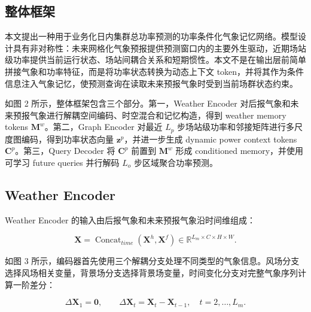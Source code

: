 

\subsection{整体框架}

本文提出一种用于业务化日内集群总功率预测的功率条件化气象记忆网络。模型设计具有非对称性：未来网格化气象预报提供预测窗口内的主要外生驱动，近期场站级功率提供当前运行状态、场站间耦合关系和短期惯性。本文不是在输出层前简单拼接气象和功率特征，而是将功率状态转换为动态上下文 token，并将其作为条件信息注入气象记忆，使预测查询在读取未来预报气象时受到当前场群状态约束。

如图 2 所示，整体框架包含三个部分。第一，Weather Encoder 对后报气象和未来预报气象进行解耦空间编码、时空混合和记忆构造，得到 weather memory tokens \(\mathbf{M}^{w}\)。第二，Graph Encoder 对最近 \(L_p\) 步场站级功率和邻接矩阵进行多尺度图编码，得到功率状态向量 \(\mathbf{z}^{p}\)，并进一步生成 dynamic power context tokens \(\mathbf{C}^{p}\)。第三，Query Decoder 将 \(\mathbf{C}^{p}\) 前置到 \(\mathbf{M}^{w}\) 形成 conditioned memory，并使用可学习 future queries 并行解码 \(L_o\) 步区域聚合功率预测。


\subsection{Weather Encoder}

Weather Encoder 的输入由后报气象和未来预报气象沿时间维组成：

\begin{equation}
\mathbf{X}=\operatorname{Concat}_{time}(\mathbf{X}^{h},\mathbf{X}^{f})\in\mathbb{R}^{L_m\times C\times H\times W}.
\end{equation}

如图 3 所示，编码器首先使用三个解耦分支处理不同类型的气象信息。风场分支选择风场相关变量，背景场分支选择背景场变量，时间变化分支对完整气象序列计算一阶差分：

\begin{equation}
\Delta\mathbf{X}_1=\mathbf{0}, \qquad
\Delta\mathbf{X}_t=\mathbf{X}_t-\mathbf{X}_{t-1}, \quad t=2,\ldots,L_m.
\end{equation}

